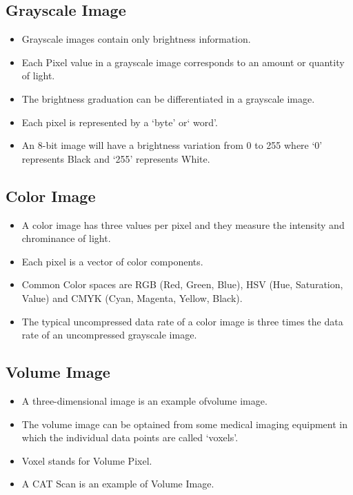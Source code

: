 \subsection{Grayscale Image}
\begin{itemize}
    \item Grayscale images contain only brightness information.
    \item Each Pixel value in a grayscale image corresponds to an amount or quantity of light.
    \item The brightness graduation can be differentiated in a grayscale image.
    \item Each pixel is represented by a `byte' or` word'.
    \item An 8-bit image will have a brightness variation from 0 to 255 where `0' represents Black and `255' represents White.
\end{itemize}

\subsection{Color Image}
\begin{itemize}
    \item A color image has three values per pixel and they measure the intensity and chrominance of light.
    \item Each pixel is a vector of color components.
    \item Common Color spaces are RGB (Red, Green, Blue), HSV (Hue, Saturation, Value) and CMYK (Cyan, Magenta, Yellow, Black).
    \item The typical uncompressed data rate of a color image is three times the data rate of an uncompressed grayscale image.
\end{itemize}

\subsection{Volume Image}
\begin{itemize}
    \item A three-dimensional image is an example ofvolume image.
    \item The volume image can be optained from some medical imaging equipment in which the individual data points are called `voxels'.
    \item Voxel stands for Volume Pixel.
    \item A CAT Scan is an example of Volume Image.
\end{itemize}

